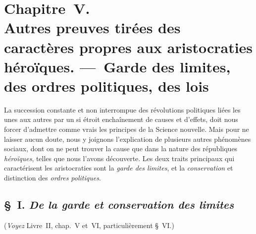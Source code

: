 \documentclass[french,twoside]{book} %
\newcommand\chapteropen{} %
\newcommand\chaptercont{} %
\begin{document}
\chapteropen
\chapter[{Chapitre V. Autres preuves tirées des caractères propres aux aristocraties héroïques. — Garde des limites, des ordres politiques, des lois}]{Chapitre V. \\
Autres preuves tirées des caractères propres aux aristocraties héroïques. — Garde des limites, des ordres politiques, des lois}

\chaptercont
\noindent  La succession constante et non interrompue des révolutions politiques liées les unes aux autres par un si étroit enchaînement de causes et d’effets, doit nous forcer d’admettre comme vrais les principes de la Science nouvelle. Mais pour ne laisser aucun doute, nous y joignons l’explication de plusieurs autres phénomènes sociaux, dont on ne peut trouver la cause que dans la nature des républiques {\itshape héroïques}, telles que nous l’avons découverte. Les deux traits principaux qui caractérisent les aristocraties sont la {\itshape garde des limites}, et la {\itshape conservation} et distinction des {\itshape ordres politiques}.\par
\section[{§ I. De la garde et conservation des limites}]{§ I. {\itshape De la garde et conservation des limites}}
\noindent ({\itshape Voyez} Livre II, chap. V et VI, particulièrement § VI.)
\end{document}
